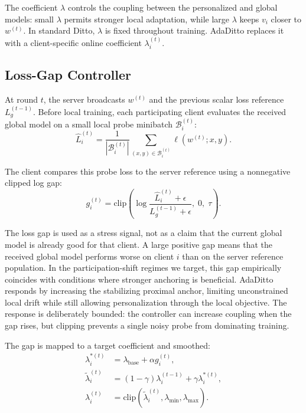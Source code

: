 \documentclass[letterpaper]{article} %
\begin{document}
The coefficient $\lambda$ controls the coupling between the personalized and global models: small $\lambda$ permits stronger local adaptation, while large $\lambda$ keeps $v_i$ closer to $w^{(t)}$. In standard Ditto, $\lambda$ is fixed throughout training. AdaDitto replaces it with a client-specific online coefficient $\lambda_i^{(t)}$.

\subsection{Loss-Gap Controller}

At round $t$, the server broadcasts $w^{(t)}$ and the previous scalar loss reference $L_g^{(t-1)}$. Before local training, each participating client evaluates the received global model on a small local probe minibatch $\mathcal{B}_i^{(t)}$:
\begin{equation}
\label{eq:probe_loss}
\hat{L}_i^{(t)}
=
\frac{1}{|\mathcal{B}_i^{(t)}|}
\sum_{(x,y)\in\mathcal{B}_i^{(t)}}
\ell(w^{(t)};x,y).
\end{equation}

The client compares this probe loss to the server reference using a nonnegative clipped log gap:
\begin{equation}
\label{eq:gap}
g_i^{(t)} =
\mathrm{clip}\left(
\log\frac{\hat{L}_i^{(t)}+\epsilon}{L_g^{(t-1)}+\epsilon},\; 0,\; \tau
\right).
\end{equation}

The loss gap is used as a stress signal, not as a claim that the
current global model is already good for that client. A large positive
gap means that the received global model performs worse on client $i$
than on the server reference population. In the participation-shift
regimes we target, this gap empirically coincides with conditions where
stronger anchoring is beneficial. AdaDitto responds by increasing the stabilizing proximal anchor,
limiting unconstrained local drift while still allowing personalization
through the local objective. The response is deliberately bounded: the
controller can increase coupling when the gap rises, but clipping
prevents a single noisy probe from dominating training.

The gap is mapped to a target coefficient and smoothed:
\begin{align}
\lambda_i^{\ast(t)} &= \lambda_{\mathrm{base}} + \alpha g_i^{(t)}, \\
\tilde{\lambda}_i^{(t)} &= (1-\gamma)\lambda_i^{(t-1)} + \gamma\lambda_i^{\ast(t)}, \\
\lambda_i^{(t)} &= \mathrm{clip}(\tilde{\lambda}_i^{(t)},\lambda_{\min},\lambda_{\max}).
\end{align}
\end{document}
